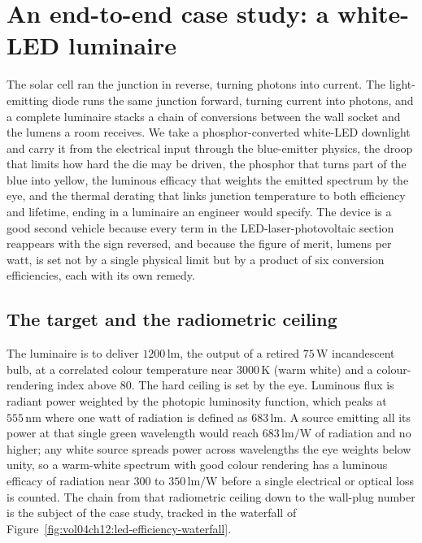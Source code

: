 \section{An end-to-end case study: a white-LED luminaire}

The solar cell ran the junction in reverse, turning photons into
current. The light-emitting diode runs the same junction forward,
turning current into photons, and a complete luminaire stacks a chain
of conversions between the wall socket and the lumens a room receives.
We take a phosphor-converted white-LED downlight and carry it from the
electrical input through the blue-emitter physics, the droop that limits
how hard the die may be driven, the phosphor that turns part of the blue
into yellow, the luminous efficacy that weights the emitted spectrum by
the eye, and the thermal derating that links junction temperature to
both efficiency and lifetime, ending in a luminaire an engineer would
specify. The device is a good second vehicle because every term in the
LED-laser-photovoltaic section reappears with the sign reversed, and
because the figure of merit, lumens per watt, is set not by a single
physical limit but by a product of six conversion efficiencies, each
with its own remedy.

\subsection{The target and the radiometric ceiling}

The luminaire is to deliver $1200\,\si{\lumen}$, the output of a retired
$75\,\si{\watt}$ incandescent bulb, at a correlated colour temperature
near $3000\,\si{\kelvin}$ (warm white) and a colour-rendering index above
$80$. The hard ceiling is set by the eye. Luminous flux is radiant power
weighted by the photopic luminosity function, which peaks at
$555\,\si{\nano\meter}$ where one watt of radiation is defined as
$683\,\si{\lumen}$. A source emitting all its power at that single green
wavelength would reach $683\,\si{\lumen\per\watt}$ of radiation and no
higher; any white source spreads power across wavelengths the eye weights
below unity, so a warm-white spectrum with good colour rendering has a
luminous efficacy of radiation near $300$ to $350\,\si{\lumen\per\watt}$
before a single electrical or optical loss is counted. The chain from
that radiometric ceiling down to the wall-plug number is the subject of
the case study, tracked in the waterfall of
Figure~\ref{fig:vol04ch12:led-efficiency-waterfall}.

